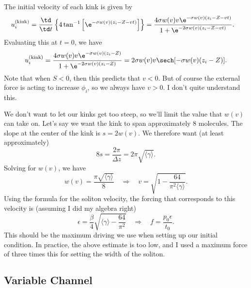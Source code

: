 \documentclass[11pt]{article}
\begin{document}
The initial velocity of each kink is given by
\begin{align*}
u_i^{(\text{kink})}
	&=\frac{\td}{\td t}\left\{4\tan^{-1}\left[
		\e^{-\sigma w(v)(z_i-Z-vt)}\right]\right\}
	=\frac{4\sigma w(v) v\e^{-\sigma w(v)(z_i-Z-vt)}}
		{1+\e^{-2\sigma w(v)(z_i-Z-vt)}}.
\end{align*}
Evaluating this at $t=0$, we have
\[
u_i^{(\text{kink})}
	=\frac{4\sigma w(v) v\e^{-\sigma w(v)(z_i-Z)}}
		{1+\e^{-2\sigma w(v)(z_i-Z)}}
	=2\sigma w(v) v\sech[-\sigma w(v)(z_i-Z)].
\]
Note that when $S<0$, then this predicts that $v<0$. But of course the external force is acting to increase $\phi_i$, so we always have $v>0$. I don't quite understand this.

We don't want to let our kinks get too steep, so we'll limit the value that $w(v)$ can take on. Let's say we want the kink to span approximately 8 molecules. The slope at the center of the kink is $s=2w(v)$. We therefore want (at least approximately)
\[
8s=\frac{2\pi}{\Delta z}=2\pi\sqrt{\langle\gamma\rangle}.
\]
Solving for $w(v)$, we have
\[
w(v)=\frac{\pi\sqrt{\langle\gamma\rangle}}{8}
\quad\Rightarrow\quad
v=\sqrt{1-\frac{64}{\pi^2\langle\gamma\rangle}}.
\]
Using the formula for the soliton velocity, the forcing that corresponds to this velocity is (assuming I did my algebra right)
\[
\epsilon=\frac{\beta}{4}\sqrt{\langle\gamma\rangle-\frac{64}{\pi^2}}
\quad\Rightarrow\quad
f=\frac{p_0\epsilon}{t_0}.
\]
This should be the maximum driving we use when setting up our initial condition. In practice, the above estimate is too low, and I used a maximum force of three times this for setting the width of the soliton.

\subsection{Variable Channel}
\end{document}
